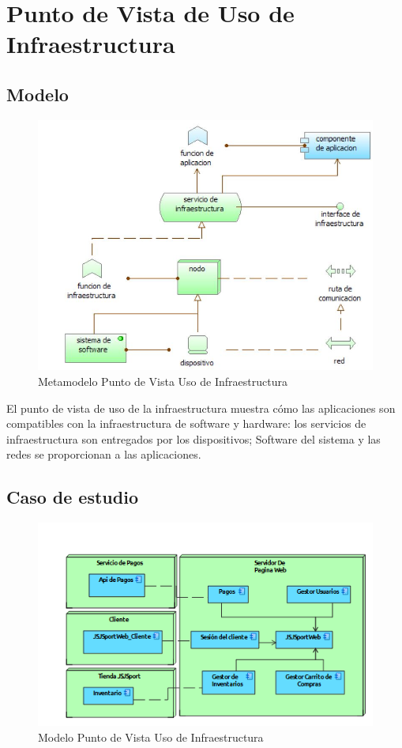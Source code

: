 \newpage

\section{Punto de Vista de Uso de Infraestructura}

\subsection{Modelo}

\begin{figure}[th!]
	\centering
	\includegraphics[width=0.6\linewidth]{arquitectura/imagenes/modeloUsoInfraestructura}
	\caption{Metamodelo Punto de Vista Uso de Infraestructura}
	\label{metamodeloUsoInfraestructura}
\end{figure}
El punto de vista de uso de la infraestructura muestra cómo las aplicaciones son compatibles con la infraestructura de software y hardware: los servicios de infraestructura son entregados por los dispositivos; Software del sistema y las redes se proporcionan a las aplicaciones. 

\subsection{Caso de estudio}

\begin{figure}[th!]
	\centering
	\includegraphics[width=0.6\linewidth]{arquitectura/imagenes/PuntoVistaUsoInfraestructura}
	\caption{Modelo Punto de Vista Uso de Infraestructura}
	\label{modeloUsoInfraestructura}
\end{figure}

